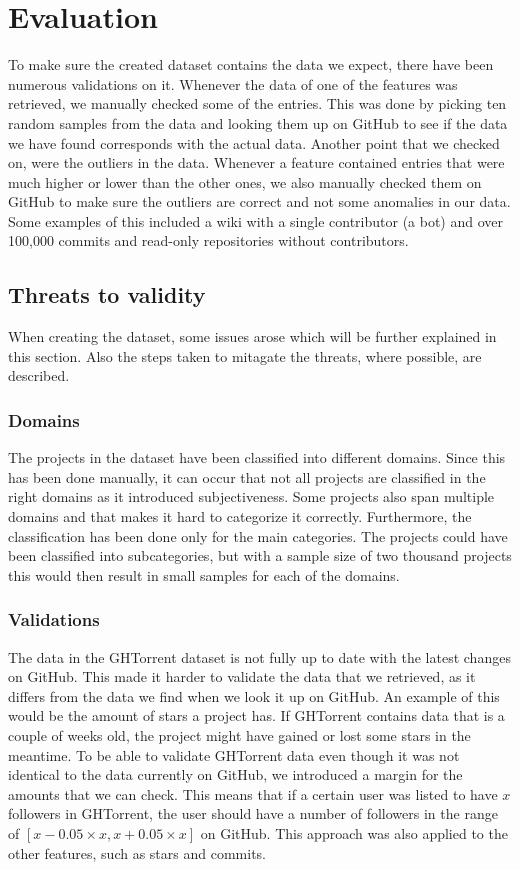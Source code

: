 \section{Evaluation}
To make sure the created dataset contains the data we expect, there have been numerous validations on it.
Whenever the data of one of the features was retrieved, we manually checked some of the entries.
This was done by picking ten random samples from the data and looking them up on GitHub to see if the data we have found corresponds with the actual data.
Another point that we checked on, were the outliers in the data.
Whenever a feature contained entries that were much higher or lower than the other ones, we also manually checked them on GitHub to make sure the outliers are correct and not some anomalies in our data.
Some examples of this included a wiki with a single contributor (a bot) and over 100,000 commits and read-only repositories without contributors. 

\subsection{Threats to validity}
When creating the dataset, some issues arose which will be further explained in this section.
Also the steps taken to mitagate the threats, where possible, are described. \\

\subsubsection{Domains}
The projects in the dataset have been classified into different domains.
Since this has been done manually, it can occur that not all projects are classified in the right domains as it introduced subjectiveness.
Some projects also span multiple domains and that makes it hard to categorize it correctly.
Furthermore, the classification has been done only for the main categories.
The projects could have been classified into subcategories, but with a sample size of two thousand projects this would then result in small samples for each of the domains.\\

\subsubsection{Validations}
The data in the GHTorrent dataset is not fully up to date with the latest changes on GitHub.
This made it harder to validate the data that we retrieved, as it differs from the data we find when we look it up on GitHub.
An example of this would be the amount of stars a project has.
If GHTorrent contains data that is a couple of weeks old, the project might have gained or lost some stars in the meantime.
To be able to validate GHTorrent data even though it was not identical to the data currently on GitHub, we introduced a margin for the amounts that we can check.
This means that if a certain user was listed to have $x$ followers in GHTorrent, the user should have a number of  followers in the range of $[x - 0.05 \times x , x + 0.05 \times x]$ on GitHub.
This approach was also applied to the other features, such as stars and commits.\\

